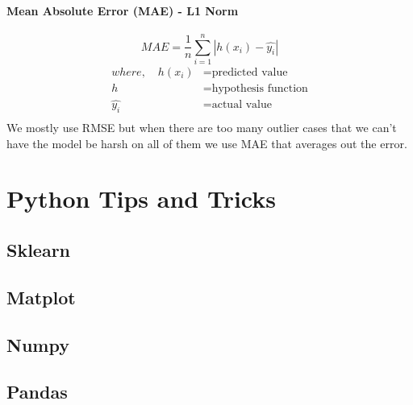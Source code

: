 \documentclass{article}
\begin{document}
\paragraph{Mean Absolute Error (MAE) - L1 Norm}
\begin{equation}
    MAE = \frac{1}{n}\sum_{i=1}^{n}|h(x_i) - \hat{y_i}|
\end{equation}
\begin{align*}
    where, \quad h(x_i) & = \text{predicted value}     \\
    h                   & = \text{hypothesis function} \\
    \hat{y_i}           & = \text{actual value}        \\
\end{align*}
We mostly use RMSE but when there are too many outlier cases that we can't have the model be harsh on all of them we use MAE that averages out the error.

\newpage
\section{Python Tips and Tricks}
\subsection{Sklearn}
\subsection{Matplot}
\subsection{Numpy}
\subsection{Pandas}
\end{document}
